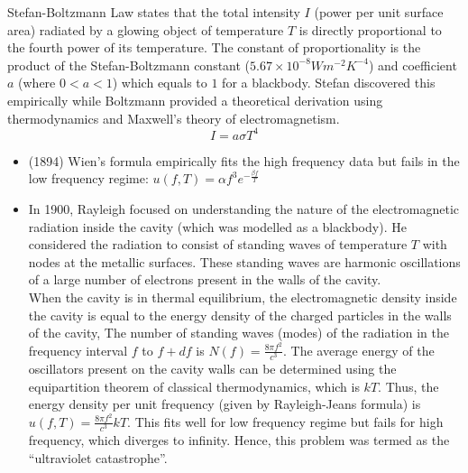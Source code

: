 \documentclass[a4paper]{article}
\begin{document}
\begin{Note}
Stefan-Boltzmann Law states that the total intensity $I$ (power per unit surface area) radiated by a glowing object of temperature $T$ is directly proportional to the fourth power of its temperature. The constant of proportionality is the product of the Stefan-Boltzmann constant ($5.67\times10^{-8}Wm^{-2}K^{-4}$) and coefficient $a$ (where $0<a<1$) which equals to $1$ for a blackbody. Stefan discovered this empirically while Boltzmann provided a theoretical derivation using thermodynamics and Maxwell's theory of electromagnetism.
$$I=a\sigma T^4$$
\begin{itemize}
\item (1894) Wien's formula empirically fits the high frequency data but fails in the low frequency regime: $u(f,T)=\alpha f^3e^{-\frac{\beta f}{T}}$
\item In 1900, Rayleigh focused on understanding the nature of the electromagnetic radiation inside the cavity (which was modelled as a blackbody). He considered the radiation to consist of standing waves of temperature $T$ with nodes at the metallic surfaces. These standing waves are harmonic oscillations of a large number of electrons present in the walls of the cavity.\\[5pt]
When the cavity is in thermal equilibrium, the electromagnetic density inside the cavity is equal to the energy density of the charged particles in the walls of the cavity, The number of standing waves (modes) of the radiation in the frequency interval $f$ to $f+df$ is $N(f)=\frac{8\pi f^2}{c^3}$. The average energy of the oscillators present on the cavity walls can be determined using the equipartition theorem of classical thermodynamics, which is $kT$. Thus, the energy density per unit frequency (given by Rayleigh-Jeans formula) is $u(f,T)=\frac{8\pi f^2}{c^3}kT$. 
This fits well for low frequency regime but fails for high frequency, which diverges to infinity. Hence, this problem was termed as the ``ultraviolet catastrophe''.
\end{itemize}
\end{Note}
\end{document}
